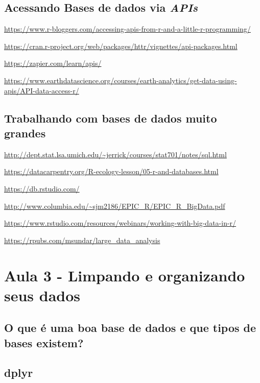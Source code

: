 \documentclass[12pt,a4paper,oneside]{erdc}
\begin{document}
\section{Acessando Bases de dados via \textit{APIs}}

\url{https://www.r-bloggers.com/accessing-apis-from-r-and-a-little-r-programming/}

\url{https://cran.r-project.org/web/packages/httr/vignettes/api-packages.html}

\url{https://zapier.com/learn/apis/}

\url{https://www.earthdatascience.org/courses/earth-analytics/get-data-using-apis/API-data-access-r/}



\section{Trabalhando com bases de dados muito grandes}

\url{http://dept.stat.lsa.umich.edu/~jerrick/courses/stat701/notes/sql.html}

\url{https://datacarpentry.org/R-ecology-lesson/05-r-and-databases.html}

\url{https://db.rstudio.com/}

\url{http://www.columbia.edu/~sjm2186/EPIC_R/EPIC_R_BigData.pdf}

\url{https://www.rstudio.com/resources/webinars/working-with-big-data-in-r/}

\url{https://rpubs.com/msundar/large_data_analysis}






%
%

\chapter{Aula 3 - Limpando e organizando seus dados}

	\section{O que é uma boa base de dados e que tipos de bases existem?}
	
	\section{dplyr}
	
\end{document}
